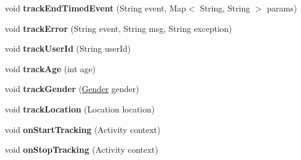 \begin{DoxyCompactItemize}
\item 
\hypertarget{interfacecom_1_1spilgames_1_1framework_1_1tracking_1_1_spil_tracker_a758d593e31e8a4196dd8f3e1ff234baa}{void {\bfseries track\-End\-Timed\-Event} (String event, Map$<$ String, String $>$ params)}\label{interfacecom_1_1spilgames_1_1framework_1_1tracking_1_1_spil_tracker_a758d593e31e8a4196dd8f3e1ff234baa}

\item 
\hypertarget{interfacecom_1_1spilgames_1_1framework_1_1tracking_1_1_spil_tracker_affa6f119d5eb82b22e234d54dba21128}{void {\bfseries track\-Error} (String event, String msg, String exception)}\label{interfacecom_1_1spilgames_1_1framework_1_1tracking_1_1_spil_tracker_affa6f119d5eb82b22e234d54dba21128}

\item 
\hypertarget{interfacecom_1_1spilgames_1_1framework_1_1tracking_1_1_spil_tracker_a9e977d696050956210c61b20604fcfbe}{void {\bfseries track\-User\-Id} (String user\-Id)}\label{interfacecom_1_1spilgames_1_1framework_1_1tracking_1_1_spil_tracker_a9e977d696050956210c61b20604fcfbe}

\item 
\hypertarget{interfacecom_1_1spilgames_1_1framework_1_1tracking_1_1_spil_tracker_aa9f82592d9d378037fc415b7204391d2}{void {\bfseries track\-Age} (int age)}\label{interfacecom_1_1spilgames_1_1framework_1_1tracking_1_1_spil_tracker_aa9f82592d9d378037fc415b7204391d2}

\item 
\hypertarget{interfacecom_1_1spilgames_1_1framework_1_1tracking_1_1_spil_tracker_af40b59697203682827f141552f55f646}{void {\bfseries track\-Gender} (\hyperlink{enumcom_1_1spilgames_1_1framework_1_1core_1_1_gender}{Gender} gender)}\label{interfacecom_1_1spilgames_1_1framework_1_1tracking_1_1_spil_tracker_af40b59697203682827f141552f55f646}

\item 
\hypertarget{interfacecom_1_1spilgames_1_1framework_1_1tracking_1_1_spil_tracker_a6332155661c56c2c8a682ac6c0c6fc6a}{void {\bfseries track\-Location} (Location location)}\label{interfacecom_1_1spilgames_1_1framework_1_1tracking_1_1_spil_tracker_a6332155661c56c2c8a682ac6c0c6fc6a}

\item 
\hypertarget{interfacecom_1_1spilgames_1_1framework_1_1tracking_1_1_spil_tracker_a3654217d53f9968ba0c9cb1435687619}{void {\bfseries on\-Start\-Tracking} (Activity context)}\label{interfacecom_1_1spilgames_1_1framework_1_1tracking_1_1_spil_tracker_a3654217d53f9968ba0c9cb1435687619}

\item 
\hypertarget{interfacecom_1_1spilgames_1_1framework_1_1tracking_1_1_spil_tracker_ac9409a72c38f57aec3fbfa010769927c}{void {\bfseries on\-Stop\-Tracking} (Activity context)}\label{interfacecom_1_1spilgames_1_1framework_1_1tracking_1_1_spil_tracker_ac9409a72c38f57aec3fbfa010769927c}

\end{DoxyCompactItemize}



